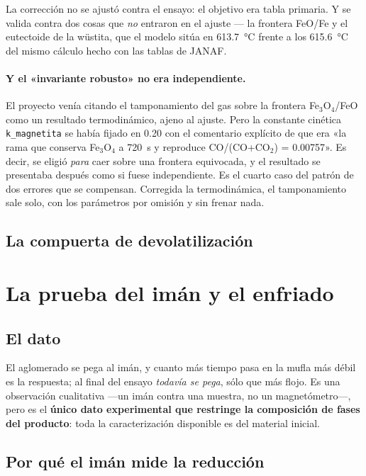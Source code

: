 \documentclass[11pt,a4paper]{article}
\begin{document}
La corrección no se ajustó contra el ensayo: el objetivo era tabla primaria. Y
se valida contra dos cosas que \emph{no} entraron en el ajuste --- la frontera
FeO/Fe y el eutectoide de la wüstita, que el modelo sitúa en
\SI{613.7}{\celsius} frente a los \SI{615.6}{\celsius} del mismo cálculo hecho
con las tablas de JANAF.

\paragraph{Y el «invariante robusto» no era independiente.} El proyecto venía
citando el tamponamiento del gas sobre la frontera Fe$_3$O$_4$/FeO como un
resultado termodinámico, ajeno al ajuste. Pero la constante cinética
\texttt{k\_magnetita} se había fijado en \num{0.20} con el comentario explícito
de que era «la rama que conserva Fe$_3$O$_4$ a \SI{720}{\second} y reproduce
CO/(CO+CO$_2$) = \num{0.00757}». Es decir, se eligió \emph{para} caer sobre una
frontera equivocada, y el resultado se presentaba después como si fuese
independiente. Es el cuarto caso del patrón de dos errores que se compensan.
Corregida la termodinámica, el tamponamiento sale solo, con los parámetros por
omisión y sin frenar nada.

\subsection{La compuerta de devolatilización}
\label{sec:puerta}



\section{La prueba del imán y el enfriado}
\label{sec:magnetismo}

\subsection{El dato}

El aglomerado se pega al imán, y cuanto más tiempo pasa en la mufla más débil es
la respuesta; al final del ensayo \emph{todavía se pega}, sólo que más flojo. Es
una observación cualitativa ---un imán contra una muestra, no un
magnetómetro---, pero es el \textbf{único dato experimental que restringe la
composición de fases del producto}: toda la caracterización disponible es del
material inicial.

\subsection{Por qué el imán mide la reducción}
\end{document}
